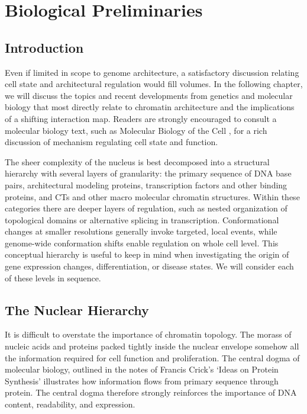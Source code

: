 
\chapter{Biological Preliminaries}

\section*{Introduction}

Even if limited in scope to genome architecture, a satisfactory discussion relating cell state and architectural regulation would fill
volumes.  In the following chapter, we will discuss the topics and recent developments from genetics and molecular biology that most
directly relate to chromatin architecture and the implications of a shifting interaction map.  Readers are strongly encouraged
to consult a molecular biology text, such as Molecular Biology of the Cell \citep{alberts2002}, for a rich discussion of mechanism
regulating cell state and function.

The sheer complexity of the nucleus is best decomposed into a structural hierarchy with several layers of granularity: the primary
sequence of \gls{DNA} base pairs, architectural modeling proteins, transcription factors and other binding proteins, and \glspl{CT}
and other macro molecular chromatin structures.  Within these categories there are deeper layers of regulation, such as nested
organization of topological domains or alternative splicing in transcription.  Conformational changes at smaller resolutions generally
invoke targeted, local events, while genome-wide conformation shifts enable regulation on whole cell level.  This conceptual hierarchy
is useful to keep in mind when investigating the origin of gene expression changes, differentiation, or disease states.  We will
consider each of these levels in sequence.

\section*{The Nuclear Hierarchy}

It is difficult to overstate the importance of chromatin topology.  The morass of nucleic acids and proteins packed tightly inside the
nuclear envelope somehow all the information required for cell function and proliferation.  The central dogma of molecular biology,
outlined in the notes of Francis Crick's `Ideas on Protein Synthesis' \citep{crick1970} illustrates how information flows from primary
sequence through protein.  The central dogma therefore strongly reinforces the importance of \gls{DNA} content, readability, and expression.

